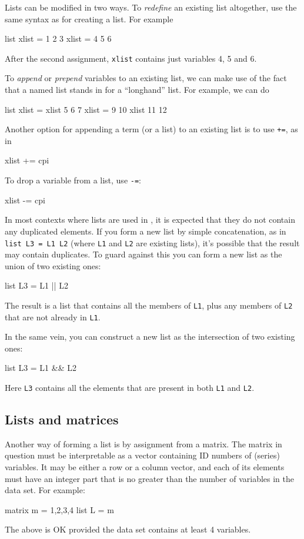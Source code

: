 Lists can be modified in two ways.  To \textit{redefine} an existing
list altogether, use the same syntax as for creating a list.  For
example
%
\begin{code}
list xlist = 1 2 3
xlist = 4 5 6
\end{code}

After the second assignment, \texttt{xlist} contains just variables 4,
5 and 6.

To \textit{append} or \textit{prepend} variables to an existing list,
we can make use of the fact that a named list stands in for a
``longhand'' list.  For example, we can do
%
\begin{code}
list xlist = xlist 5 6 7
xlist = 9 10 xlist 11 12
\end{code}
%
Another option for appending a term (or a list) to an existing list is
to use \texttt{+=}, as in
%
\begin{code}
xlist += cpi
\end{code}
%
To drop a variable from a list, use \texttt{-=}:
%
\begin{code}
xlist -= cpi
\end{code}
%

In most contexts where lists are used in , it is expected
that they do not contain any duplicated elements.  If you form a new
list by simple concatenation, as in \texttt{list L3 = L1 L2}
(where \texttt{L1} and \texttt{L2} are existing lists), it's possible
that the result may contain duplicates.  To guard against this you can
form a new list as the union of two existing ones:
%
\begin{code}
list L3 = L1 || L2
\end{code}
%
The result is a list that contains all the members of \texttt{L1},
plus any members of \texttt{L2} that are not already in \texttt{L1}.

In the same vein, you can construct a new list as the intersection of
two existing ones:
%
\begin{code}
list L3 = L1 && L2
\end{code}
%
Here \texttt{L3} contains all the elements that are present in both
\texttt{L1} and \texttt{L2}.


\subsection{Lists and matrices}

Another way of forming a list is by assignment from a matrix.  The
matrix in question must be interpretable as a vector containing ID
numbers of (series) variables.  It may be either a row or a column
vector, and each of its elements must have an integer part that is
no greater than the number of variables in the data set.  For example:
%
\begin{code}
matrix m = {1,2,3,4}
list L = m
\end{code}
%
The above is OK provided the data set contains at least 4 variables.

